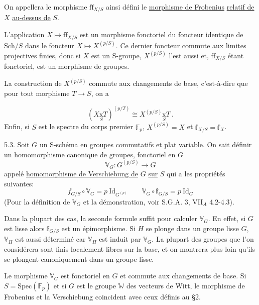 \documentclass[11pt]{article}
\newcommand{\scanpage}[1]{\par\bigskip\noindent{\small\sffamily[scan #1]}\par}
\newcommand{\mspage}[1]{{\small\sffamily[p.\,#1]}}
\newcommand{\hand}[1]{\textcolor{blue}{#1}}
\newcommand{\uline}[1]{\underline{#1}}
\begin{document}
On appellera le morphisme $\mathrm{ff}_{X/S}$ ainsi défini le \uline{morphisme de Frobenius}
\uline{relatif de} $X$ \uline{au-dessus de} $S$.

L'application $X \mapsto \mathrm{ff}_{X/S}$ est un morphisme fonctoriel du foncteur
identique de $\mathrm{Sch}/S$ dans le foncteur $X \mapsto X^{(p/S)}$. Ce dernier foncteur
commute aux limites projectives finies, donc si $X$ est un S-groupe,
$X^{(p/S)}$ l'est aussi et, $\mathrm{ff}_{X/S}$ étant fonctoriel, est un morphisme de groupes.

La construction de $X^{(p/S)}$ commute aux changements de base,
c'est-à-dire que pour tout morphisme $T \to S$, on a

\mspage{\hand{11}}

\clearpage
\scanpage{129/12}
\[ (X \underset{S}{\text{x}} T)^{(p/T)} \cong X^{(p/S)} \underset{S}{\text{x}} T \ . \]
Enfin, si $S$ est le spectre du corps premier $\mathbb{F}_p$, $X^{(p/S)} = X$ et
$\mathbb{f}_{X/S} = \mathbb{f}_X$.

5.3. Soit $G$ un S-schéma en groupes commutatifs et plat variable.
On sait définir un homomorphisme canonique de groupes, fonctoriel en $G$
\[ \mathbb{V}_G \colon G^{(p/S)} \to G \]
appelé \uline{homomorphisme de Verschiebung de} $G$ \uline{sur} $S$ qui a les propriétés
suivantes:
\[ \boxed{ f_{G/S} \circ \mathbb{V}_G = p \ \mathrm{Id}_{G^{(p)}} \qquad \mathbb{V}_G \circ \mathbb{f}_{G/S} = p \ \mathrm{Id}_G } \]
(Pour la définition de $\mathbb{V}_G$ et la démonstration, voir S.G.A. 3, VII$_A$
4.2-4.3).

Dans la plupart des cas, la seconde formule suffit pour calculer
$\mathbb{V}_G$. En effet, si $G$ est lisse alors $\mathbb{f}_{G/S}$ est un épimorphisme. Si $H$
se plonge dans un groupe lisse $G$, $\mathbb{V}_H$ est aussi déterminé car $\mathbb{V}_H$ est
induit par $\mathbb{V}_G$. La plupart des groupes que l'on considérera sont finis
localement libres sur la base, et on montrera plus loin qu'ils se plongent
canoniquement dans un groupe lisse.

Le morphisme $\mathbb{V}_G$ est fonctoriel en $G$ et commute aux changements
de base. Si $S = \mathrm{Spec}(\mathbb{F}_p)$ et si $G$ est le groupe $\mathbb{W}$ des vecteurs de
Witt, le morphisme de Frobenius et la Verschiebung coincident avec ceux
définis au §2.
\end{document}
